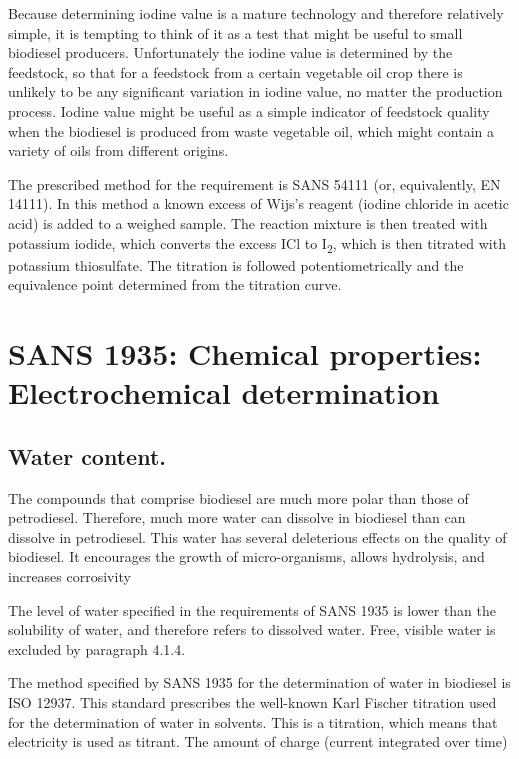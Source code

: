 Because determining iodine value is a mature technology and therefore relatively
simple, it is tempting to think of it as a test that might be useful to small
biodiesel producers. Unfortunately the iodine value is determined by the
feedstock, so that for a feedstock from a certain vegetable oil crop there is
unlikely to be any significant variation in iodine value, no matter the
production process. Iodine value might be useful as a simple indicator of
feedstock quality when the biodiesel is produced from waste vegetable oil, which
might contain a variety of oils from different origins.

The prescribed method for the requirement is SANS 54111 (or, equivalently, EN
14111). In this method a known excess of Wijs's reagent (iodine chloride in
acetic acid) is added to a weighed sample. The reaction mixture is then treated
with potassium iodide, which converts the excess ICl to I\textsubscript{2},
which is then titrated with potassium thiosulfate. The titration is followed
potentiometrically and the equivalence point determined from the titration
curve.

\section{SANS 1935: Chemical properties: Electrochemical determination}

\subsection{Water content.}

The compounds that comprise biodiesel are much more polar than those of
petrodiesel. Therefore, much more water can dissolve in biodiesel than can
dissolve in petrodiesel. This water has several deleterious effects on the
quality of biodiesel. It encourages the growth of micro-organisms, allows
hydrolysis, and increases corrosivity

The level of water specified in the requirements of SANS 1935 is lower than the
solubility of water, and therefore refers to dissolved water. Free, visible
water is excluded by paragraph 4.1.4.

The method specified by SANS 1935 for the determination of water in biodiesel is
ISO 12937. This standard prescribes the well-known Karl Fischer titration used
for the determination of water in solvents. This is a 
titration, which means that electricity is used as titrant. The amount of charge
(current integrated over time)



